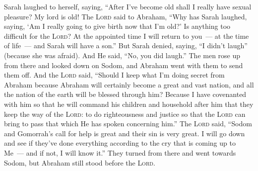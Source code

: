 \begin{inparaenum}
   Sarah laughed to herself, saying, ``After I've become old shall I really have sexual pleasure? My lord is old!%
   The \textsc{Lord} said to Abraham, ``Why has Sarah laughed, saying, `Am I really going to give birth now that I'm old?'%
   Is anything too difficult for the \textsc{Lord}? At the appointed time I will return to you~--- at the time of life~--- and Sarah will have a son.''%
   But Sarah denied, saying, ``I didn't laugh'' (because she was afraid). And He said, ``No, you did laugh.''%
   The men rose up from there and looked down on Sodom, and Abraham went with them to send them off.%
   And the \textsc{Lord} said, ``Should I keep what I'm doing secret from Abraham%
   because Abraham will certainly become a great and vast nation, and all the nation of the earth will be blessed through him?%
   Because I have covenanted with him so that he will command his children and household after him that they keep the way of the \textsc{Lord}: to do righteousness and justice so that the \textsc{Lord} can bring to pass that which He has spoken concerning him.''%
   The \textsc{Lord} said, ``Sodom and Gomorrah's call for help is great and their sin is very great.%
   I will go down and see if they've done everything according to the cry that is coming up to Me~--- and if not, I will know it.''%
   They turned from there and went towards Sodom, but Abraham still stood before the \textsc{Lord}.%

\end{inparaenum}
